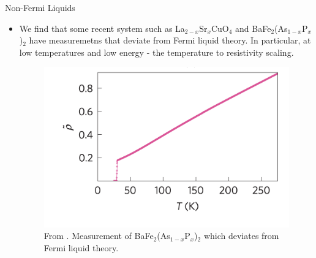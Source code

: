 \documentclass{beamer}
\begin{document}
\begin{frame}{Non-Fermi Liquids}

\begin{itemize}
    \item We find that some recent system such as La$_{2-x}$Sr$_{x}$CuO$_{4}$ \cite{Takagi_1992}and BaFe$_{2}$(As$_{1-x}$P$_{x}$)$_{2}$\cite{Hayes_2016} have measuremetns that deviate from Fermi liquid theory. In particular, at low temperatures and low energy - the temperature to resistivity scaling.
    \begin{figure}
        \centering
        \includegraphics[scale = 0.4]{Linear.png}
        \caption{From \cite{Hayes_2016}. Measurement of BaFe$_{2}$(As$_{1-x}$P$_{x}$)$_{2}$ which deviates from Fermi liquid theory. }
        \label{fig:enter-label}
    \end{figure}
\end{itemize}
    
\end{frame}
\end{document}

